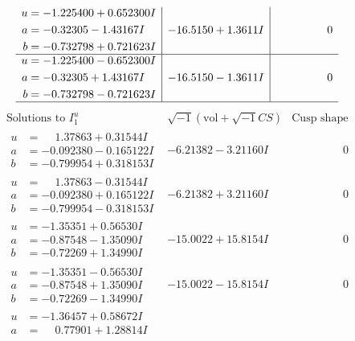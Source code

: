 \documentclass[1p]{elsarticle_modified}
\theoremstyle{definition}
\newcommand{\I}{\sqrt{-1}}
\begin{document}
$$\begin{array}{c|c|c}
\begin{aligned}
u &= -1.225400 + 0.652300 I \\
a &= -0.32305 - 1.43167 I \\
b &= -0.732798 + 0.721623 I\end{aligned}
 & -16.5150 + 1.3611 I & \phantom{-0.000000 } 0 \\ \hline\begin{aligned}
u &= -1.225400 - 0.652300 I \\
a &= -0.32305 + 1.43167 I \\
b &= -0.732798 - 0.721623 I\end{aligned}
 & -16.5150 - 1.3611 I & \phantom{-0.000000 } 0\\
 \hline 
 \end{array}$$\newpage$$\begin{array}{c|c|c}  
\text{Solutions to }I^u_{1}& \I (\text{vol} + \sqrt{-1}CS) & \text{Cusp shape}\\
 \hline 
\begin{aligned}
u &= \phantom{-}1.37863 + 0.31544 I \\
a &= -0.092380 - 0.165122 I \\
b &= -0.799954 + 0.318153 I\end{aligned}
 & -6.21382 - 3.21160 I & \phantom{-0.000000 } 0 \\ \hline\begin{aligned}
u &= \phantom{-}1.37863 - 0.31544 I \\
a &= -0.092380 + 0.165122 I \\
b &= -0.799954 - 0.318153 I\end{aligned}
 & -6.21382 + 3.21160 I & \phantom{-0.000000 } 0 \\ \hline\begin{aligned}
u &= -1.35351 + 0.56530 I \\
a &= -0.87548 - 1.35090 I \\
b &= -0.72269 + 1.34990 I\end{aligned}
 & -15.0022 + 15.8154 I & \phantom{-0.000000 } 0 \\ \hline\begin{aligned}
u &= -1.35351 - 0.56530 I \\
a &= -0.87548 + 1.35090 I \\
b &= -0.72269 - 1.34990 I\end{aligned}
 & -15.0022 - 15.8154 I & \phantom{-0.000000 } 0 \\ \hline\begin{aligned}
u &= -1.36457 + 0.58672 I \\
a &= \phantom{-}0.77901 + 1.28814 I \\

\end{aligned}
\end{array}$$
\end{document}
